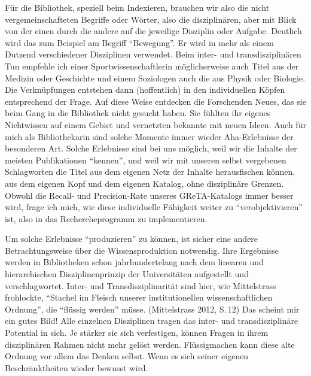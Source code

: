 Für die Bibliothek, speziell beim Indexieren, brauchen wir also die
nicht vergemeinschafteten Begriffe oder Wörter, also die disziplinären,
aber mit Blick von der einen durch die andere auf die jeweilige
Disziplin oder Aufgabe. Deutlich wird das zum Beispiel am Begriff
\enquote{Bewegung}. Er wird in mehr als einem Dutzend verschiedener
Disziplinen verwendet. Beim inter- und transdisziplinären Tun empfehle
ich einer Sportwissenschaftlerin möglicherweise auch Titel aus der
Medizin oder Geschichte und einem Soziologen auch die aus Physik oder
Biologie. Die Verknüpfungen entstehen dann (hoffentlich) in den
individuellen Köpfen entsprechend der Frage. Auf diese Weise entdecken
die Forschenden Neues, das sie beim Gang in die Bibliothek nicht gesucht
haben. Sie fühlten ihr eigenes Nichtwissen auf einem Gebiet und
vernetzten bekannte mit neuen Ideen. Auch für mich als Bibliothekarin
sind solche Momente immer wieder Aha-Erlebnisse der besonderen Art.
Solche Erlebnisse sind bei uns möglich, weil wir die Inhalte der meisten
Publikationen \enquote{kennen}, und weil wir mit unseren selbst
vergebenen Schlagworten die Titel aus dem eigenen Netz der Inhalte
herausfischen können, aus dem eigenen Kopf und dem eigenen Katalog, ohne
disziplinäre Grenzen. Obwohl die Recall- und Precision-Rate unseres
GReTA-Katalogs immer besser wird, frage ich mich, wie diese individuelle
Fähigkeit weiter zu \enquote{verobjektivieren} ist, also in das
Rechercheprogramm zu implementieren.

Um solche Erlebnisse \enquote{produzieren} zu können, ist sicher eine
andere Betrachtungsweise über die Wissensproduktion notwendig. Ihre
Ergebnisse werden in Bibliotheken schon jahrhundertelang nach dem
linearen und hierarchischen Disziplinenprinzip der Universitäten
aufgestellt und verschlagwortet. Inter- und Transdisziplinarität sind
hier, wie Mittelstrass frohlockte, \enquote{Stachel im Fleisch unserer
institutionellen wissenschaftlichen Ordnung}, die \enquote{flüssig
werden} müsse. (Mittelstrass 2012, S.\,12) Das scheint mir ein gutes
Bild! Alle einzelnen Disziplinen tragen das inter- und transdisziplinäre
Potential in sich. Je stärker sie sich verfestigen, können Fragen in
ihrem disziplinären Rahmen nicht mehr gelöst werden. Flüssigmachen kann
diese alte Ordnung vor allem das Denken selbst. Wenn es sich seiner
eigenen Beschränktheiten wieder bewusst wird.

